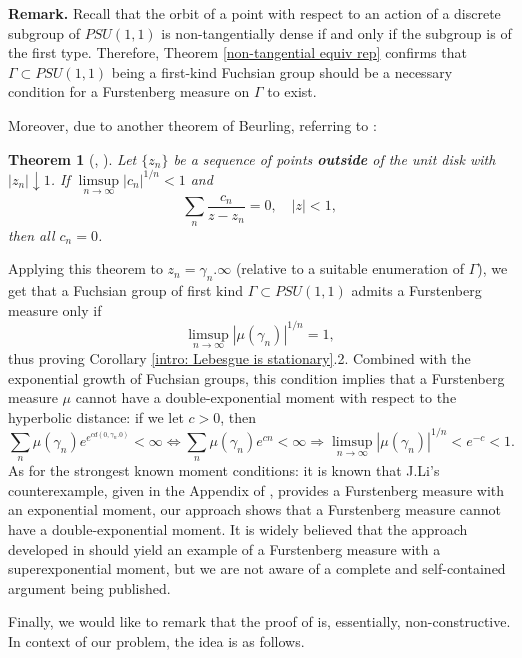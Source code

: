 \documentclass[11pt]{article}
\newtheorem{theorem}{Theorem}[section]
\begin{document}
\textbf{Remark.} Recall that the orbit of a point with respect to an action of a discrete subgroup of $PSU(1,1)$ is non-tangentially dense if and only if the subgroup is of the first type. Therefore, Theorem \ref{non-tangential equiv rep} confirms that $\Gamma \subset PSU(1,1)$ being a first-kind Fuchsian group should be a necessary condition for a Furstenberg measure on $\Gamma$ to exist.

Moreover, due to another theorem of Beurling, referring to \cite[Corollary 4.2.24]{Shapiro1968}:

\begin{theorem}[\cite{beurling1934fonctions}, \cite{beurling1989collected}]
	Let $\{ z_n \}$ be a sequence of points \textbf{outside} of the unit disk with $|z_n| \downarrow 1$. If $\limsup\limits_{n \rightarrow \infty} |c_n|^{1/n} < 1$ and
	\[
	\sum_n \frac{c_n}{z - z_n} = 0, \quad |z| < 1,
	\]
	then all $c_n = 0$.
\end{theorem}
Applying this theorem to $z_n = \gamma_n.\infty$ (relative to a suitable enumeration of $\Gamma$), we get that a Fuchsian group of first kind $\Gamma \subset PSU(1,1)$ admits a Furstenberg measure only if
\[
\limsup\limits_{n \rightarrow \infty} |\mu(\gamma_n)|^{1/n} = 1,
\] 
thus proving Corollary \ref{intro: Lebesgue is stationary}.2. Combined with the exponential growth of Fuchsian groups, this condition implies that a Furstenberg measure $\mu$ cannot have a double-exponential moment with respect to the hyperbolic distance: if we let $c > 0$, then
\[
\sum_{n} \mu(\gamma_n) e^{e^{c d(0, \gamma_n.0)}} < \infty \iff \sum_{n} \mu(\gamma_n) e^{c n} < \infty \Rightarrow \limsup\limits_{n \rightarrow \infty} |\mu(\gamma_n)|^{1/n} < e^{-c} < 1.
\]
As for the strongest known moment conditions: it is known that J.Li's counterexample, given in the Appendix of \cite{10.1215/00127094-2020-0058}, provides a Furstenberg measure with an exponential moment, our approach shows that a Furstenberg measure cannot have a double-exponential moment. It is widely believed that the approach developed in \cite{connellmuchnik} should yield an example of a Furstenberg measure with a superexponential moment, but we are not aware of a complete and self-contained argument being published.

Finally, we would like to remark that the proof of \cite[Theorem 3]{brownsums} is, essentially, non-constructive. In context of our problem, the idea is as follows.
\end{document}

